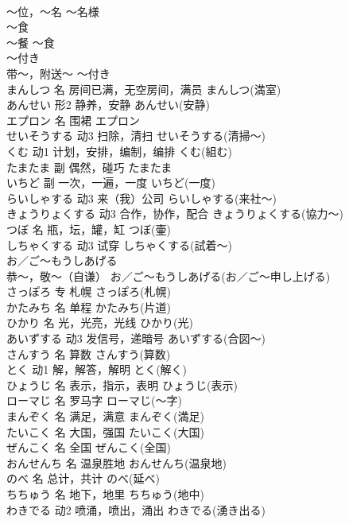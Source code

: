 \documentclass[8pt]{extreport}
\begin{document}
\begin{CJK}{UTF8}{min}
\\	～位，～名	～名様	
\\	～食	
\\	～餐	～食	
\\	～付き	
\\	带～，附送～	～付き	
\\	まんしつ	名	房间已满，无空房间，满员	まんしつ(満室)	
\\	あんせい	形2	静养，安静	あんせい(安静)	
\\	エプロン	名	围裙	エプロン	
\\	せいそうする	动3	扫除，清扫	せいそうする(清掃～)	
\\	くむ	动1	计划，安排，编制，编排	くむ(組む)	
\\	たまたま	副	偶然，碰巧	たまたま	
\\	いちど	副	一次，一遍，一度	いちど(一度)	
\\	らいしゃする	动3	来（我）公司	らいしゃする(来社～)	
\\	きょうりょくする	动3	合作，协作，配合	きょうりょくする(協力～)	
\\	つぼ	名	瓶，坛，罐，缸	つぼ(壷)	
\\	しちゃくする	动3	试穿	しちゃくする(試着～)	
\\	お／ご～もうしあげる	
\\	恭～，敬～（自谦）	お／ご～もうしあげる(お／ご～申し上げる)	
\\	さっぽろ	专	札幌	さっぽろ(札幌)	
\\	かたみち	名	单程	かたみち(片道)	
\\	ひかり	名	光，光亮，光线	ひかり(光)	
\\	あいずする	动3	发信号，递暗号	あいずする(合図～)	
\\	さんすう	名	算数	さんすう(算数)	
\\	とく	动1	解，解答，解明	とく(解く)	
\\	ひょうじ	名	表示，指示，表明	ひょうじ(表示)	
\\	ローマじ	名	罗马字	ローマじ(～字)	
\\	まんぞく	名	满足，满意	まんぞく(満足)	
\\	たいこく	名	大国，强国	たいこく(大国)	
\\	ぜんこく	名	全国	ぜんこく(全国)	
\\	おんせんち	名	温泉胜地	おんせんち(温泉地)	
\\	のべ	名	总计，共计	のべ(延べ)	
\\	ちちゅう	名	地下，地里	ちちゅう(地中)	
\\	わきでる	动2	喷涌，喷出，涌出	わきでる(湧き出る)	

\end{CJK}
\end{document}
